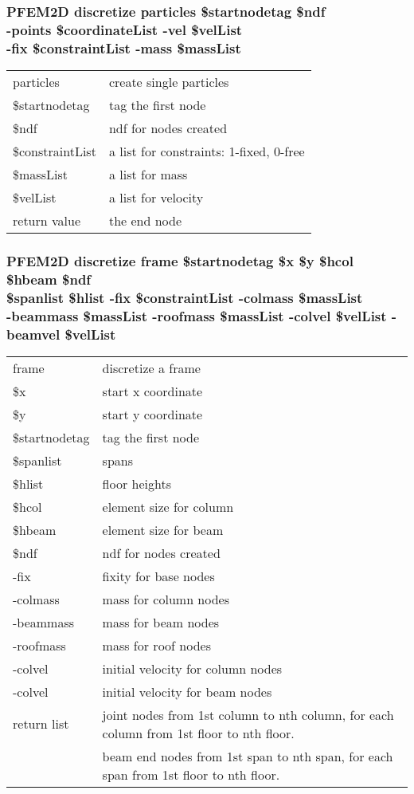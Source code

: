 \documentclass[12pt]{article}
\begin{document}
\subsubsection*{PFEM2D discretize particles \$startnodetag \$ndf\\
-points \$coordinateList -vel \$velList\\
-fix \$constraintList -mass \$massList }
\begin{tabular}{ll}
particles & create single particles\\
\$startnodetag & tag the first node\\ 
\$ndf & ndf for nodes created\\
\$constraintList & a list for constraints: 1-fixed, 0-free\\
\$massList & a list for mass\\
\$velList & a list for velocity\\
return value & the end node
\end{tabular}

\subsubsection*{PFEM2D discretize frame \$startnodetag 
\$x \$y \$hcol \$hbeam \$ndf \\
\$spanlist \$hlist -fix \$constraintList -colmass \$massList\\
-beammass \$massList -roofmass \$massList
-colvel \$velList -beamvel \$velList }
\begin{tabular}{ll}
frame & discretize a frame\\
\$x & start x coordinate\\
\$y & start y coordinate\\
\$startnodetag & tag the first node\\ 
\$spanlist & spans\\
\$hlist & floor heights\\
\$hcol & element size for column\\
\$hbeam & element size for beam\\
\$ndf & ndf for nodes created\\
-fix & fixity for base nodes\\
-colmass & mass for column nodes\\
-beammass & mass for beam nodes\\
-roofmass & mass for roof nodes\\
-colvel & initial velocity for column nodes\\
-colvel & initial velocity for beam nodes\\
return list & joint nodes from 1st column to nth column, for each column
from 1st floor to nth floor.\\
& beam end nodes from 1st span to nth span, for each span from 1st floor
to nth floor.
\end{tabular}
\end{document}
